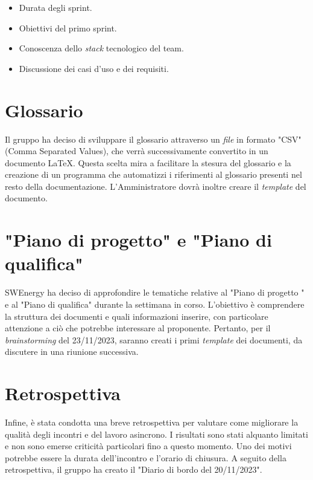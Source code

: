 \begin{itemize}
	\item Durata degli sprint.
	\item Obiettivi del primo sprint.
	\item Conoscenza dello \textit{stack} tecnologico del team.
	\item Discussione dei casi d'uso e dei requisiti.
\end{itemize}

\section{Glossario}

Il gruppo ha deciso di sviluppare il glossario attraverso un \textit{file} in
formato "CSV" (Comma Separated Values), che verrà successivamente convertito
in un documento \LaTeX{}. Questa scelta mira a facilitare la stesura del
glossario e la creazione di un programma che automatizzi i riferimenti al
glossario presenti nel resto della documentazione. L'Amministratore dovrà
inoltre creare il \textit{template} del documento.

\section{"Piano di progetto" e "Piano di qualifica"}

SWEnergy ha deciso di approfondire le tematiche relative al "Piano di progetto
" e al "Piano di qualifica" durante la settimana in corso. L'obiettivo è
comprendere la struttura dei documenti e quali informazioni inserire, con
particolare attenzione a ciò che potrebbe interessare al proponente. Pertanto,
per il \textit{brainstorming} del 23/11/2023, saranno creati i primi \textit{
	template} dei documenti, da discutere in una riunione successiva.

\section{Retrospettiva}

Infine, è stata condotta una breve retrospettiva per valutare come migliorare
la qualità degli incontri e del lavoro asincrono. I risultati sono stati
alquanto limitati e non sono emerse criticità particolari fino a questo momento.
Uno dei motivi potrebbe essere la durata dell'incontro e l'orario di chiusura.
A seguito della retrospettiva, il gruppo ha creato il "Diario di bordo del 
20/11/2023".
